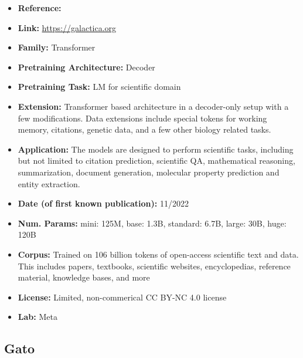 \documentclass{article}
\begin{document}
            \begin{itemize}
                \item \textbf{Reference:} \href{https://arxiv.org/abs/2211.09085}{}
                \item \textbf{Link:} \url{https://galactica.org}
                \item \textbf{Family:} Transformer 
                \item \textbf{Pretraining Architecture:} Decoder
                \item \textbf{Pretraining Task:} LM for scientific domain
                \item \textbf{Extension:} Transformer based architecture in a decoder-only setup with a few modifications. Data extensions include special tokens for working memory, citations, genetic data, and a few other biology related tasks. 
                \item \textbf{Application:} The models are designed to perform scientific tasks, including but not limited to citation prediction, scientific QA, mathematical reasoning, summarization, document generation, molecular property prediction and entity extraction.
                \item \textbf{Date (of first known publication):} 11/2022
                \item \textbf{Num. Params:} mini: 125M, base: 1.3B, standard: 6.7B, large: 30B, huge: 120B
                \item \textbf{Corpus:} Trained on 106 billion tokens of open-access scientific text and data. This includes papers, textbooks, scientific websites, encyclopedias, reference material, knowledge bases, and more
                \item \textbf{License:} Limited, non-commerical CC BY-NC 4.0 license
                \item \textbf{Lab:} Meta
            \end{itemize}
            
            
\subsection{Gato}
\end{document}
